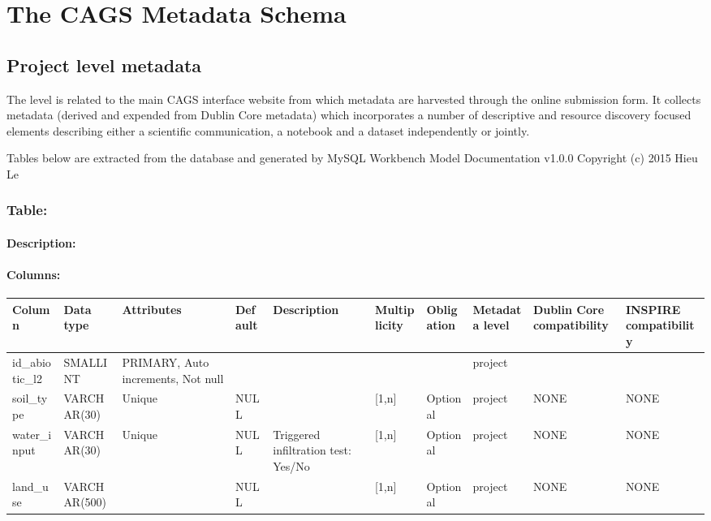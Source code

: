 \documentclass[letterpaper,10pt,english]{sphinxmanual}
\begin{document}
\chapter{The CAGS Metadata Schema}
\label{\detokenize{schema_documentation:the-cags-metadata-schema}}\label{\detokenize{schema_documentation::doc}}

\section{Project level metadata}
\label{\detokenize{schema_documentation:project-level-metadata}}
The  level is related to the main CAGS interface website from which metadata are harvested through the online submission form. It collects metadata (derived and expended from Dublin Core metadata) which incorporates a number of descriptive and resource discovery focused elements describing either a scientific communication, a notebook and a dataset independently or jointly.

Tables below are extracted from the database and generated by MySQL Workbench Model Documentation v1.0.0 \sphinxhyphen{} Copyright (c)
2015 Hieu Le


\subsection{Table: }
\label{\detokenize{schema_documentation:table-abiotic}}

\subsubsection{Description:}
\label{\detokenize{schema_documentation:description}}

\subsubsection{Columns:}
\label{\detokenize{schema_documentation:columns}}

\begin{savenotes}\sphinxattablestart
\centering
\begin{tabulary}{\linewidth}[t]{|T|T|T|T|T|T|T|T|T|T|}
\hline

Column
&
Data type
&
Attributes
&
Default
&
Description
&
Multiplicity
&
Obligation
&
Metadata level
&
Dublin Core
compatibility
&
INSPIRE
compatibility
\\
\hline
id\_abiotic\_l2
&
SMALLINT
&
PRIMARY, Auto   increments, Not null
&&&&&
project
&&\\
\hline
soil\_type
&
VARCHAR(30)
&
Unique
&
NULL
&&
{[}1,n{]}
&
Optional
&
project
&
NONE
&
NONE
\\
\hline
water\_input
&
VARCHAR(30)
&
Unique
&
NULL
&
Triggered infiltration test:    Yes/No
&
{[}1,n{]}
&
Optional
&
project
&
NONE
&
NONE
\\
\hline
land\_use
&
VARCHAR(500)
&&
NULL
&&
{[}1,n{]}
&
Optional
&
project
&
NONE
&
NONE
\\
\hline
\end{tabulary}
\par
\sphinxattableend\end{savenotes}
\end{document}
